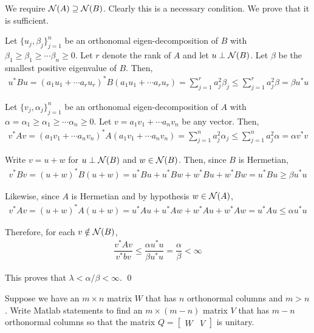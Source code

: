 \documentclass[10pt]{article}
\begin{document}
\begin{solution}[Solution]
We require \( \mathcal{N}(A) \supseteq \mathcal{N}(B) \). Clearly this is a necessary condition. We prove that it is sufficient.

Let \( \{u_j,\beta_j\}_{j=1}^{n} \) be an orthonomal eigen-decomposition of \( B \) with \( \beta_1 \geq \beta_1\geq \cdots \beta_n \geq 0 \). Let \( r \) denote the rank of \( A \) and let \( u\perp \mathcal{N}(B) \). Let \( \beta \) be the smallest positive eigenvalue of \( B \).  Then,
\begin{align*}
    u^*Bu = (a_1u_1 + \cdots a_ru_r)^*B(a_1u_1 + \cdots a_ru_r)
    = \sum_{j=1}^{r} a_j^2 \beta_j
    \leq \sum_{j=1}^{r} a_j^2 \beta
    = \beta u^*u
\end{align*}

Let \( \{v_j,\alpha_j\}_{j=1}^{n} \) be an orthonomal eigen-decomposition of \( A \) with \( \alpha = \alpha_1 \geq \alpha_1\geq \cdots \alpha_n \geq 0 \). Let \( v = a_1 v_1 + \cdots a_n v_n \) be any vector. Then,
\begin{align*}
    v^*Av =  (a_1v_1 + \cdots a_n v_n)^*A(a_1v_1 + \cdots a_n v_n)
    = \sum_{j=1}^{n} a_j^2 \alpha_j
    \leq \sum_{j=1}^{n} a_j^2 \alpha
    = \alpha v^*v
\end{align*}

Write \( v = u+w \) for \( u\perp \mathcal{N}(B) \) and \( w\in \mathcal{N}(B) \). Then, since \( B \) is Hermetian,
\begin{align*}
    v^*Bv = (u+w)^*B(u+w) = u^*Bu + u^*Bw + w^*Bu + w^*Bw = u^*Bu \geq \beta u^*u
\end{align*}

Likewise, since \( A \) is Hermetian and by hypothesis \( w\in\mathcal{N}(A) \),
\begin{align*}
    v^*Av = (u+w)^*A(u+w) = u^*Au + u^*Aw + w^*Au + w^*Aw = u^*Au \leq \alpha u^*u
\end{align*}

Therefore, for each \( v\notin \mathcal{N}(B) \),
\begin{align*}
    \dfrac{v^*Av}{v^*bv} \leq \dfrac{\alpha u^*u}{\beta u^*u} = \dfrac{\alpha}{\beta} < \infty
\end{align*}

This proves that \( \lambda < \alpha / \beta < \infty \). \qed

\end{solution}

\begin{problem}
Suppose we have an \( m\times n \) matrix \( W \) that has \( n \) orthonormal columns and \( m>n \). Write Matlab statements to find an \( m\times(m-n) \) matrix \( V \) that has \( m-n \) orthonormal columns so that the matrix \( Q = \left[\begin{array}{cc}W&V\end{array}\right] \) is unitary.
\end{problem}
\end{document}
